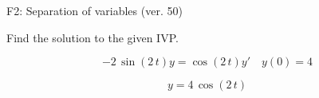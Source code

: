 \begin{exercise}
  \begin{exerciseTitle}F2: Separation of variables (ver. 50)\end{exerciseTitle}
  \begin{exerciseStatement}
    
Find the solution to the given IVP.

    
\[-2 \, \sin\left(2 \, t\right) y= \cos\left(2 \, t\right) y'\hspace{1em} y\left( 0 \right)= 4\]

  \end{exerciseStatement}
  \begin{exerciseAnswer}
    
\[y= 4 \, \cos\left(2 \, t\right)\]

  \end{exerciseAnswer}
\end{exercise}